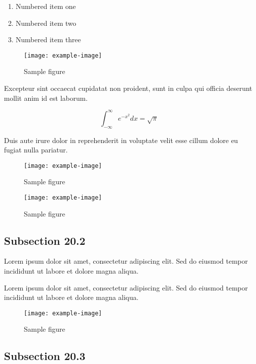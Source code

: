 \documentclass{article}
\begin{document}
\begin{enumerate}
\item Numbered item one
\item Numbered item two
\item Numbered item three
\end{enumerate}

\begin{figure}[h]
    \centering
    \texttt{[image: example-image]}
    \caption{Sample figure}
    \label{fig:sample}
\end{figure}

Excepteur sint occaecat cupidatat non proident, sunt in culpa qui officia deserunt mollit anim id est laborum.

\begin{equation}
    \int_{-\infty}^{\infty} e^{-x^2} dx = \sqrt{\pi}
\end{equation}

Duis aute irure dolor in reprehenderit in voluptate velit esse cillum dolore eu fugiat nulla pariatur.

\begin{figure}[h]
    \centering
    \texttt{[image: example-image]}
    \caption{Sample figure}
    \label{fig:sample}
\end{figure}

\begin{figure}[h]
    \centering
    \texttt{[image: example-image]}
    \caption{Sample figure}
    \label{fig:sample}
\end{figure}

\subsection{Subsection 20.2}

Lorem ipsum dolor sit amet, consectetur adipiscing elit. Sed do eiusmod tempor incididunt ut labore et dolore magna aliqua.

Lorem ipsum dolor sit amet, consectetur adipiscing elit. Sed do eiusmod tempor incididunt ut labore et dolore magna aliqua.

\begin{figure}[h]
    \centering
    \texttt{[image: example-image]}
    \caption{Sample figure}
    \label{fig:sample}
\end{figure}

\subsection{Subsection 20.3}
\end{document}
